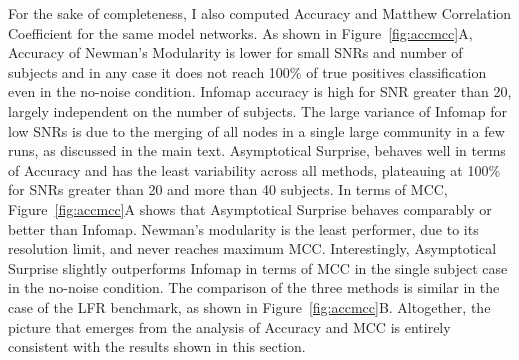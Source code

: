 For the sake of completeness, I also computed Accuracy and Matthew Correlation Coefficient for the same model networks.
As shown in Figure~\ref{fig:accmcc}A, Accuracy of Newman's Modularity is lower for small SNRs and number of subjects and in any case it does not reach 100\% of true positives classification even in the no-noise condition. Infomap accuracy is high for SNR greater than 20, largely independent on the number of subjects. The large variance of Infomap for low SNRs is due to the merging of all nodes in a single large community in a few runs, as discussed in the main text. Asymptotical Surprise, behaves well in terms of Accuracy and has the least variability across all methods, plateauing at 100\% for SNRs greater than 20 and more than 40 subjects.
In terms of MCC, Figure~\ref{fig:accmcc}A shows that Asymptotical Surprise behaves comparably or better than Infomap.
Newman's modularity is the least performer, due to its resolution limit, and never reaches maximum MCC.
Interestingly, Asymptotical Surprise slightly outperforms Infomap in terms of MCC in the single subject case in the no-noise condition.
The comparison of the three methods is similar in the case of the LFR benchmark, as shown in Figure~\ref{fig:accmcc}B.
Altogether, the picture that emerges from the analysis of Accuracy and MCC is entirely consistent with the results shown in this section.



